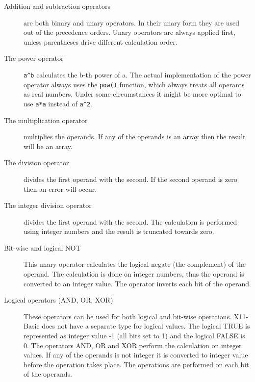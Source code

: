 \begin{description}
\item[Addition and subtraction operators] are both binary and unary operators.
In their unary form they are used out of the precedence orders. Unary operators
are always applied first, unless parentheses drive different calculation order.
\item[The power operator] \verb|a^b| calculates the b-th power of a. The actual
implementation of the power operator always uses the \verb|pow()| function, which always
treats all operants as real numbers. Under some circumstances it might be more
optimal to use \verb|a*a| instead of \verb|a^2|.
\item[The multiplication operator] multiplies the operands. If any of the
operands is an array then the result will be an array.
\item[The division operator] divides the first operand with the second. If the
second operand is zero then an error will occur.
\item[The integer division operator] divides the first operand with the second.
The calculation is performed using integer numbers and the result is truncated
towards zero. 
\item[Bit-wise and logical NOT] This unary operator calculates the logical 
negate (the complement) of the operand. The calculation is done on integer numbers, thus the 
operand is converted to an integer value. The operator inverts each bit of the 
operand.
\item[Logical operators (AND, OR, XOR)] These operators can be used for both
logical and bit-wise operations. X11-Basic does not have a separate type for
logical values. The logical TRUE is represented as integer value -1 (all bits
set to 1) and the logical FALSE is 0. The operators AND, OR and XOR perform the
calculation on integer values. If any of the operands is not integer it is
converted to integer value before the operation takes place. The operations are
performed on each bit of the operands. 
\end{description}


